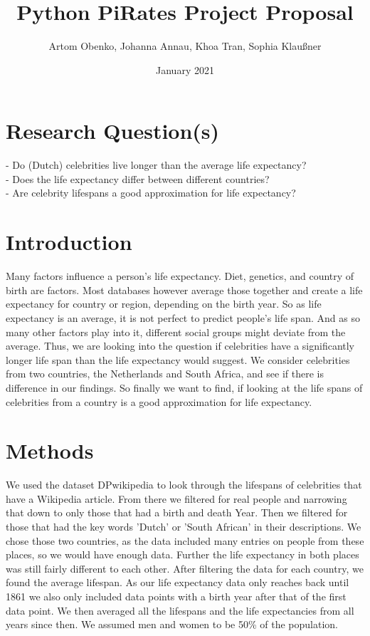 \documentclass{article}
\title{Python PiRates Project Proposal}
\author{Artom Obenko, Johanna Annau, Khoa Tran, Sophia Klaußner }
\date{January 2021}
\begin{document}
	
\maketitle
	
\section{Research Question(s)}
	- Do (Dutch) celebrities live longer than the average life expectancy?\\
	- Does the life expectancy differ between different countries?\\
	- Are celebrity lifespans a good approximation for life expectancy?\\
	
\section{Introduction}
Many factors influence a person's life expectancy. Diet, genetics, and country of birth are factors. Most databases however average those together and create a life expectancy for country or region, depending on the birth year. %
So as life expectancy is an average, it is not perfect to predict people's life span. And as so many other factors play into it, different social groups might deviate from the average. Thus, we are looking into the question if celebrities have a significantly longer life span than the life expectancy would suggest. We consider celebrities from two countries, the Netherlands and South Africa, and see if there is difference in our findings. So finally we want to find, if looking at the life spans of celebrities from a country is a good approximation for life expectancy.

\section{Methods}
We used the dataset DPwikipedia to look through the lifespans of celebrities that have a Wikipedia article. From there we filtered for real people and narrowing that down to only those that had a birth and death Year. Then we filtered for those that had the key words 'Dutch' or 'South African' in their descriptions. We chose those two countries, as the data included many entries on people from these places, so we would have enough data. Further the life expectancy in both places was still fairly different to each other. After filtering the data for each country, we found the average lifespan. As our life expectancy data only reaches back until 1861 we also only included data points with a birth year after that of the first data point. We then averaged all the lifespans and the life expectancies from all years since then. We assumed men and women to be 50\% of the population.
 
\end{document}
